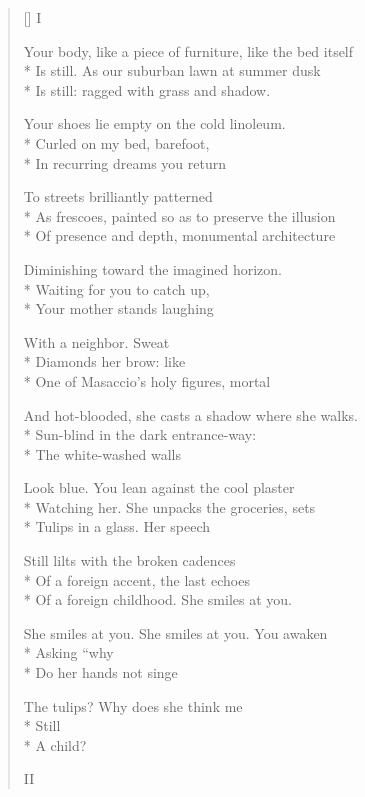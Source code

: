 \label{ch:a_shadowed_poem}
\settowidth{\versewidth}{Your body, like a piece of furniture, like the bed itself}
\begin{verse}[\versewidth]
 \qquad  \qquad  \qquad I

Your body, like a piece of furniture, like the bed itself\\*
Is still. As our suburban lawn at summer dusk\\*
Is still: ragged with grass and shadow.

Your shoes lie empty on the cold linoleum.\\*
Curled on my bed, barefoot,\\*
In recurring dreams you return

To streets brilliantly patterned\\*
As frescoes, painted so as to preserve the illusion\\*
Of presence and depth, monumental architecture

Diminishing toward the imagined horizon.\\*
Waiting for you to catch up,\\*
Your mother stands laughing

With a neighbor.  Sweat\\*
Diamonds her brow: like\\*
One of Masaccio's holy figures, mortal

And hot-blooded, she casts a shadow where she walks.\\*
Sun-blind in the dark entrance-way:\\*
The white-washed walls

Look blue.  You lean against the cool plaster\\*
Watching her.  She unpacks the groceries, sets\\*
Tulips in a glass.  Her speech

Still lilts with the broken cadences\\*
Of a foreign accent, the last echoes\\*
Of a foreign childhood.  She smiles at you.

She smiles at you. She smiles at you. You awaken\\*
Asking ``why\\*
Do her hands not singe

The tulips? Why does she think me\\*
Still\\*
A child?

 \qquad  \qquad  \qquad II


\end{verse}
